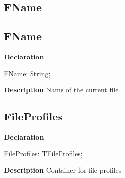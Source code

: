 \documentclass{report}
\newif\ifpdf
\begin{document}
\subsection*{\large{\textbf{FName}}\normalsize\hspace{1ex}\hrulefill}
\else
\subsection*{FName}
\fi
\label{editor-FName}
\begin{list}{}{
\setlength{\itemindent}{0cm}
\setlength{\listparindent}{0cm}
\setlength{\leftmargin}{\evensidemargin}
\addtolength{\leftmargin}{\tmplength}
\settowidth{\labelsep}{X}
\addtolength{\leftmargin}{\labelsep}
\setlength{\labelwidth}{\tmplength}
}
\item[\textbf{Declaration}\hfill]
\ifpdf
\begin{flushleft}
\fi
\begin{ttfamily}
FName: String;\end{ttfamily}

\ifpdf
\end{flushleft}
\fi

\par
\item[\textbf{Description}]
Name of the current file

\end{list}
\ifpdf
\subsection*{\large{\textbf{FileProfiles}}\normalsize\hspace{1ex}\hrulefill}
\else
\subsection*{FileProfiles}
\fi
\label{editor-FileProfiles}
\begin{list}{}{
\setlength{\itemindent}{0cm}
\setlength{\listparindent}{0cm}
\setlength{\leftmargin}{\evensidemargin}
\addtolength{\leftmargin}{\tmplength}
\settowidth{\labelsep}{X}
\addtolength{\leftmargin}{\labelsep}
\setlength{\labelwidth}{\tmplength}
}
\item[\textbf{Declaration}\hfill]
\ifpdf
\begin{flushleft}
\fi
\begin{ttfamily}
FileProfiles: TFileProfiles;\end{ttfamily}

\ifpdf
\end{flushleft}
\fi

\par
\item[\textbf{Description}]
Container for file profiles

\end{list}
\end{document}
